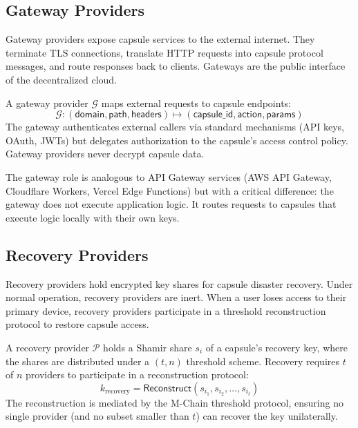 \subsection{Gateway Providers}

Gateway providers expose capsule services to the external internet. They
terminate TLS connections, translate HTTP requests into capsule protocol
messages, and route responses back to clients. Gateways are the public
interface of the decentralized cloud.

\begin{definition}
A gateway provider $\mathcal{G}$ maps external requests to capsule endpoints:
\begin{equation}
    \mathcal{G}: (\mathsf{domain}, \mathsf{path}, \mathsf{headers}) \mapsto (\mathsf{capsule\_id}, \mathsf{action}, \mathsf{params})
\end{equation}
The gateway authenticates external callers via standard mechanisms (API keys,
OAuth, JWTs) but delegates authorization to the capsule's access control
policy. Gateway providers never decrypt capsule data.
\end{definition}

The gateway role is analogous to API Gateway services (AWS API Gateway,
Cloudflare Workers, Vercel Edge Functions) but with a critical difference:
the gateway does not execute application logic. It routes requests to
capsules that execute logic locally with their own keys.

\subsection{Recovery Providers}

Recovery providers hold encrypted key shares for capsule disaster recovery.
Under normal operation, recovery providers are inert. When a user loses
access to their primary device, recovery providers participate in a
threshold reconstruction protocol to restore capsule access.

\begin{definition}
A recovery provider $\mathcal{P}$ holds a Shamir share $s_i$ of a capsule's
recovery key, where the shares are distributed under a $(t, n)$ threshold
scheme. Recovery requires $t$ of $n$ providers to participate in a
reconstruction protocol:
\begin{equation}
    k_{\text{recovery}} = \mathsf{Reconstruct}(s_{i_1}, s_{i_2}, \ldots, s_{i_t})
\end{equation}
The reconstruction is mediated by the M-Chain threshold protocol, ensuring
no single provider (and no subset smaller than $t$) can recover the key
unilaterally.
\end{definition}


